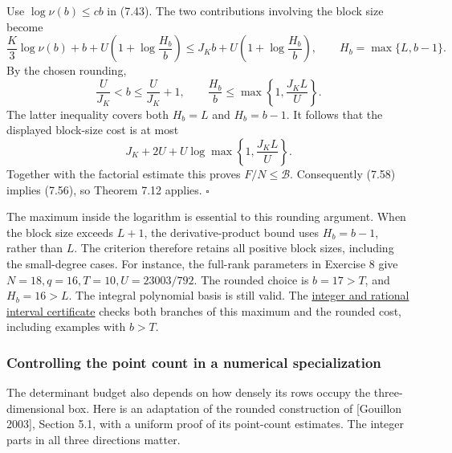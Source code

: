 \documentclass[
  11pt,
  a4paper,
]{article}
\begin{document}
Use \(\log\nu(b)\le cb\) in (7.43). The two contributions involving the
block size become \[
\frac K3\log\nu(b)+b+
U\left(1+\log\frac{H_b}{b}\right)
\le J_Kb+U\left(1+\log\frac{H_b}{b}\right),
\qquad H_b=\max\{L,b-1\}.
\] By the chosen rounding, \[
\frac{U}{J_K}<b\le\frac{U}{J_K}+1,\qquad
\frac{H_b}{b}\le\max\left\{1,\frac{J_KL}{U}\right\}.
\] The latter inequality covers both \(H_b=L\) and \(H_b=b-1\). It
follows that the displayed block-size cost is at most \[
J_K+2U+U\log\max\left\{1,\frac{J_KL}{U}\right\}.
\] Together with the factorial estimate this proves
\(F/N\le\mathcal B\). Consequently (7.58) implies (7.56), so Theorem
7.12 applies. \(\square\)

The maximum inside the logarithm is essential to this rounding argument.
When the block size exceeds \(L+1\), the derivative-product bound uses
\(H_b=b-1\), rather than \(L\). The criterion therefore retains all
positive block sizes, including the small-degree cases. For instance,
the full-rank parameters in Exercise 8 give
\(N=18,q=16,T=10,U=23003/792\). The rounded choice is \(b=17>T\), and
\(H_b=16>L\). The integral polynomial basis is still valid. The
\href{https://kokunoyumeto.github.io/open-math-courses-public/courses/TR-BAKER/verification/gouillon_uniform_budget.py}{integer and rational
interval certificate} checks both branches of this maximum and the
rounded cost, including examples with \(b>T\).

\subsubsection{Controlling the point count in a numerical
specialization}\label{controlling-the-point-count-in-a-numerical-specialization}

The determinant budget also depends on how densely its rows occupy the
three-dimensional box. Here is an adaptation of the rounded construction
of {[}Gouillon 2003{]}, Section 5.1, with a uniform proof of its
point-count estimates. The integer parts in all three directions matter.
\end{document}
